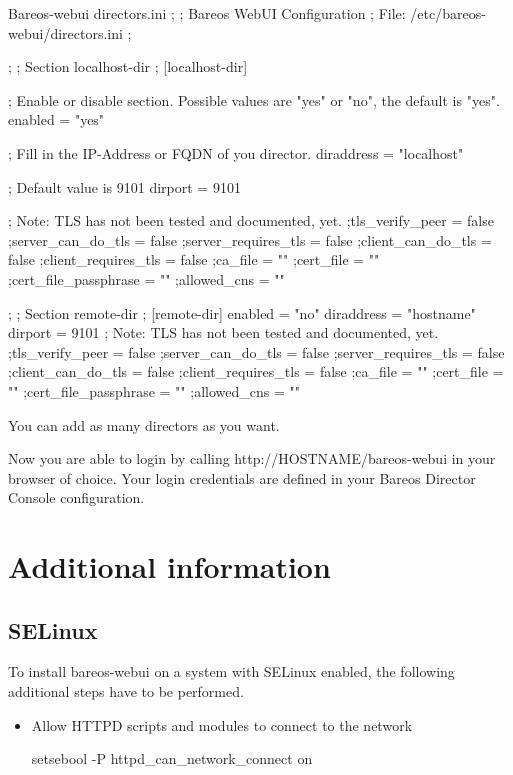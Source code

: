 \begin{bconfig}{Bareos-webui directors.ini}
;
; Bareos WebUI Configuration
; File: /etc/bareos-webui/directors.ini
;

;
; Section localhost-dir
;
[localhost-dir]

; Enable or disable section. Possible values are "yes" or "no", the default is "yes".
enabled = "yes"

; Fill in the IP-Address or FQDN of you director.
diraddress = "localhost"

; Default value is 9101
dirport = 9101

; Note: TLS has not been tested and documented, yet.
;tls_verify_peer = false
;server_can_do_tls = false
;server_requires_tls = false
;client_can_do_tls = false
;client_requires_tls = false
;ca_file = ""
;cert_file = ""
;cert_file_passphrase = ""
;allowed_cns = ""

;
; Section remote-dir
;
[remote-dir]
enabled = "no"
diraddress = "hostname"
dirport = 9101
; Note: TLS has not been tested and documented, yet.
;tls_verify_peer = false
;server_can_do_tls = false
;server_requires_tls = false
;client_can_do_tls = false
;client_requires_tls = false
;ca_file = ""
;cert_file = ""
;cert_file_passphrase = ""
;allowed_cns = ""
\end{bconfig}

You can add as many directors as you want.

Now you are able to login by calling http://HOSTNAME/bareos-webui in your browser of choice. Your login credentials are defined in your Bareos Director Console configuration.

\section{Additional information}

\subsection{SELinux}

To install bareos-webui on a system with SELinux enabled, the following additional steps have to be performed.
\begin{itemize}
 \item Allow HTTPD scripts and modules to connect to the network
\begin{commands}{}
setsebool -P httpd_can_network_connect on
\end{commands}
\end{itemize}

